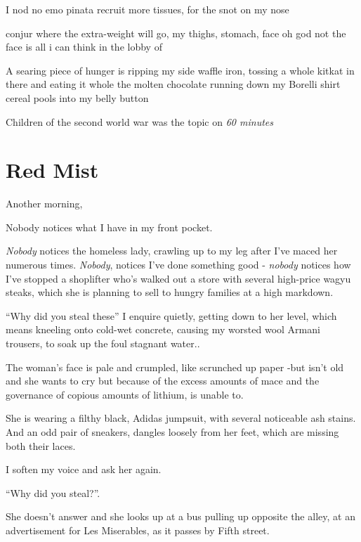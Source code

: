 \documentclass[19pt,openany]{book}
\begin{document}
I nod no
 emo pinata
recruit more tissues,
for the snot on my nose

conjur where the extra-weight
will go, my thighs, stomach,
face oh god not the face
is all i can think in the lobby
of

A searing piece of hunger
is ripping my side
waffle iron,
tossing a whole kitkat
in there and eating it
whole the molten chocolate
running down my Borelli
shirt
cereal pools into my belly
button

Children of the second world
war was the topic on
\textit{60 minutes}
\chapter{Red Mist}


Another morning,

Nobody notices what I
have in my front pocket.

\textit{Nobody} notices the homeless lady,
crawling up to my leg after I've
maced her numerous times. \textit{Nobody}, notices I've done something good -
\textit{nobody} notices how
I've stopped a shoplifter who's walked
out a store with
several high-price wagyu steaks,
which she is planning
to sell to hungry families at a high
markdown.

``Why did you steal these'' I enquire
quietly, getting down to her level,
which means kneeling onto cold-wet
concrete, causing my worsted
wool Armani trousers, to soak
up the foul stagnant water..

The woman's face is pale and
crumpled, like scrunched up
paper -but
isn't old and she
wants to cry but
because of the excess
amounts of mace and the governance
of copious
amounts of lithium, is unable to.

She is wearing
a filthy black, Adidas
jumpsuit, with several
noticeable ash stains.
And an odd pair of sneakers,
dangles loosely from her feet, which
are missing both their laces.

I soften my voice and ask her again.

``Why did you steal?''.

She doesn't answer
and she looks up at a bus
pulling up opposite the
alley, at an advertisement
for Les Miserables, as it
passes by Fifth street.
\end{document}
